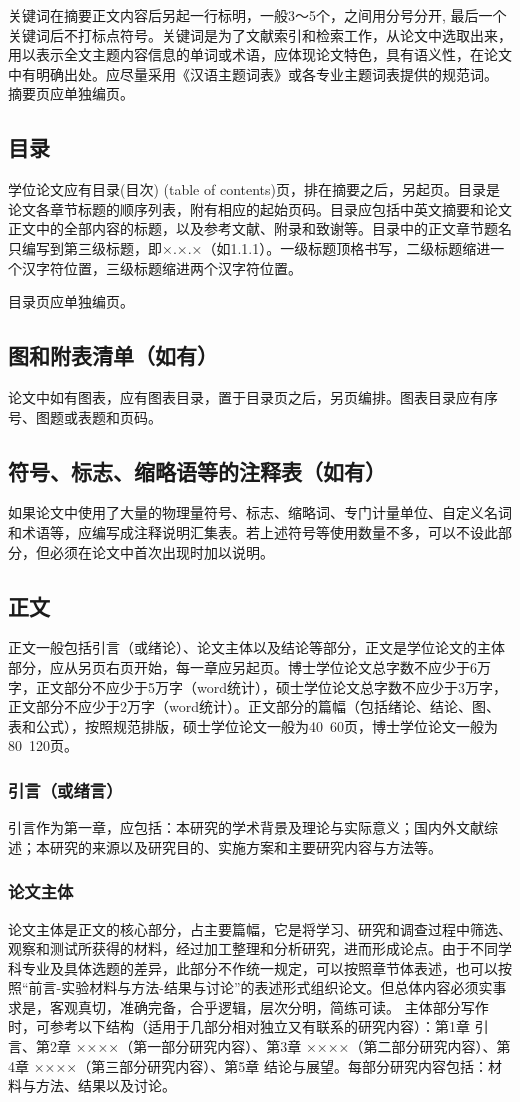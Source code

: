 关键词在摘要正文内容后另起一行标明，一般3～5个，之间用分号分开, 最后一个关键词后不打标点符号。关键词是为了文献索引和检索工作，从论文中选取出来，用以表示全文主题内容信息的单词或术语，应体现论文特色，具有语义性，在论文中有明确出处。应尽量采用《汉语主题词表》或各专业主题词表提供的规范词。
摘要页应单独编页。

\subsection{目录}
学位论文应有目录(目次) (table of contents)页，排在摘要之后，另起页。目录是论文各章节标题的顺序列表，附有相应的起始页码。目录应包括中英文摘要和论文正文中的全部内容的标题，以及参考文献、附录和致谢等。目录中的正文章节题名只编写到第三级标题，即×.×.×（如1.1.1）。一级标题顶格书写，二级标题缩进一个汉字符位置，三级标题缩进两个汉字符位置。

目录页应单独编页。

\subsection{图和附表清单（如有）}
论文中如有图表，应有图表目录，置于目录页之后，另页编排。图表目录应有序号、图题或表题和页码。
\subsection{符号、标志、缩略语等的注释表（如有）}
如果论文中使用了大量的物理量符号、标志、缩略词、专门计量单位、自定义名词和术语等，应编写成注释说明汇集表。若上述符号等使用数量不多，可以不设此部分，但必须在论文中首次出现时加以说明。
\subsection{正文}
正文一般包括引言（或绪论）、论文主体以及结论等部分，正文是学位论文的主体部分，应从另页右页开始，每一章应另起页。博士学位论文总字数不应少于6万字，正文部分不应少于5万字（word统计），硕士学位论文总字数不应少于3万字，正文部分不应少于2万字（word统计）。正文部分的篇幅（包括绪论、结论、图、表和公式），按照规范排版，硕士学位论文一般为40~60页，博士学位论文一般为80~120页。
\subsubsection{引言（或绪言）}
引言作为第一章，应包括：本研究的学术背景及理论与实际意义；国内外文献综述；本研究的来源以及研究目的、实施方案和主要研究内容与方法等。
\subsubsection{论文主体}
论文主体是正文的核心部分，占主要篇幅，它是将学习、研究和调查过程中筛选、观察和测试所获得的材料，经过加工整理和分析研究，进而形成论点。由于不同学科专业及具体选题的差异，此部分不作统一规定，可以按照章节体表述，也可以按照“前言-实验材料与方法-结果与讨论”的表述形式组织论文。但总体内容必须实事求是，客观真切，准确完备，合乎逻辑，层次分明，简练可读。
主体部分写作时，可参考以下结构（适用于几部分相对独立又有联系的研究内容）：第1章 引言、第2章 ××××（第一部分研究内容）、第3章 ××××（第二部分研究内容）、第4章 ××××（第三部分研究内容）、第5章 结论与展望。每部分研究内容包括：材料与方法、结果以及讨论。

